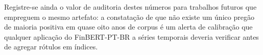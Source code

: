 Registre-se ainda o valor de auditoria destes números para trabalhos futuros que empreguem o mesmo
artefato: a constatação de que não existe um único pregão de maioria positiva em quase oito anos de
corpus é um alerta de calibração que qualquer aplicação do \mbox{FinBERT-PT-BR} a séries temporais
deveria verificar antes de agregar rótulos em índices.
